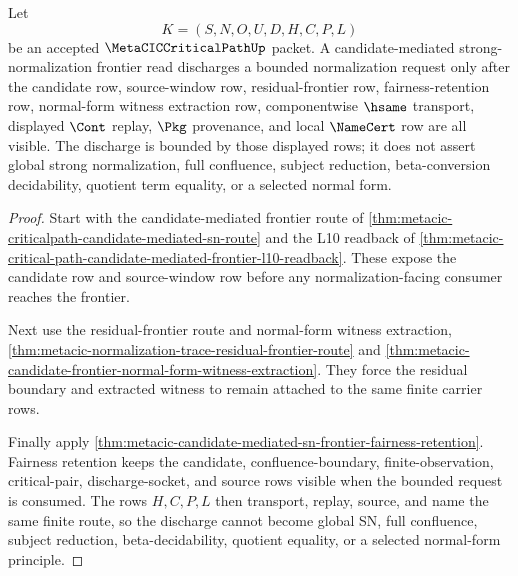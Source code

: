 \begin{theorem}
\label{thm:metacic-candidate-mediated-sn-bounded-discharge-route}
Let
$$
K=(S,N,O,U,D,H,C,P,L)
$$
be an accepted $\MetaCICCriticalPathUp$ packet. A candidate-mediated strong-normalization frontier read discharges a bounded normalization request only after the candidate row, source-window row, residual-frontier row, fairness-retention row, normal-form witness extraction row, componentwise $\hsame$ transport, displayed $\Cont$ replay, $\Pkg$ provenance, and local $\NameCert$ row are all visible. The discharge is bounded by those displayed rows; it does not assert global strong normalization, full confluence, subject reduction, beta-conversion decidability, quotient term equality, or a selected normal form.
\end{theorem}
\begin{proof}
Start with the candidate-mediated frontier route of \autoref{thm:metacic-criticalpath-candidate-mediated-sn-route} and the L10 readback of \autoref{thm:metacic-critical-path-candidate-mediated-frontier-l10-readback}. These expose the candidate row and source-window row before any normalization-facing consumer reaches the frontier.

Next use the residual-frontier route and normal-form witness extraction, \autoref{thm:metacic-normalization-trace-residual-frontier-route} and \autoref{thm:metacic-candidate-frontier-normal-form-witness-extraction}. They force the residual boundary and extracted witness to remain attached to the same finite carrier rows.

Finally apply \autoref{thm:metacic-candidate-mediated-sn-frontier-fairness-retention}. Fairness retention keeps the candidate, confluence-boundary, finite-observation, critical-pair, discharge-socket, and source rows visible when the bounded request is consumed. The rows $H,C,P,L$ then transport, replay, source, and name the same finite route, so the discharge cannot become global SN, full confluence, subject reduction, beta-decidability, quotient equality, or a selected normal-form principle.
\end{proof}

